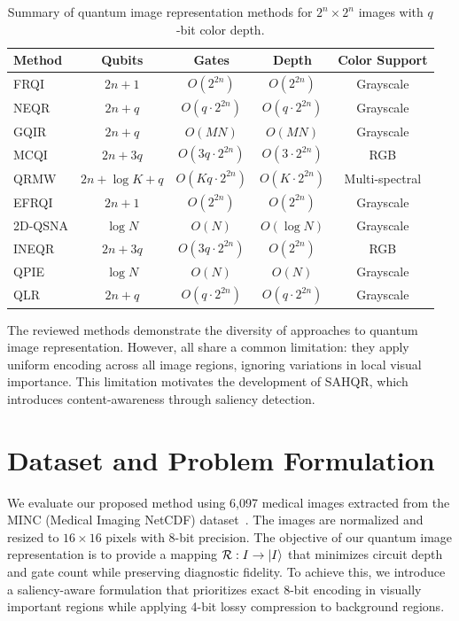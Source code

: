 \documentclass{ipol}
\begin{document}
\begin{table}[!htbp]
\caption{Summary of quantum image representation methods for $2^n \times 2^n$ images with $q$-bit color depth.}
\label{tab:related_summary}
\centering
\begin{tabular}{@{}lcccc@{}}
\toprule
Method & Qubits & Gates & Depth & Color Support \\
\midrule
FRQI & $2n+1$ & $O(2^{2n})$ & $O(2^{2n})$ & Grayscale \\
NEQR & $2n+q$ & $O(q \cdot 2^{2n})$ & $O(q \cdot 2^{2n})$ & Grayscale \\
GQIR & $2n+q$ & $O(MN)$ & $O(MN)$ & Grayscale \\
MCQI & $2n+3q$ & $O(3q \cdot 2^{2n})$ & $O(3 \cdot 2^{2n})$ & RGB \\
QRMW & $2n+\log K+q$ & $O(Kq \cdot 2^{2n})$ & $O(K \cdot 2^{2n})$ & Multi-spectral \\
EFRQI & $2n+1$ & $O(2^{2n})$ & $O(2^{2n})$ & Grayscale \\
2D-QSNA & $\log N$ & $O(N)$ & $O(\log N)$ & Grayscale \\
INEQR & $2n+3q$ & $O(3q \cdot 2^{2n})$ & $O(2^{2n})$ & RGB \\
QPIE & $\log N$ & $O(N)$ & $O(N)$ & Grayscale \\
QLR & $2n+q$ & $O(q \cdot 2^{2n})$ & $O(q \cdot 2^{2n})$ & Grayscale \\
\bottomrule
\end{tabular}
\end{table}

The reviewed methods demonstrate the diversity of approaches to quantum image representation. However, all share a common limitation: they apply uniform encoding across all image regions, ignoring variations in local visual importance. This limitation motivates the development of SAHQR, which introduces content-awareness through saliency detection.

\section{Dataset and Problem Formulation}\label{sec:dataset_problem}

We evaluate our proposed method using 6,097 medical images extracted from the MINC (Medical Imaging NetCDF) dataset~\cite{bib64}. The images are normalized and resized to $16 \times 16$ pixels with 8-bit precision. 
The objective of our quantum image representation is to provide a mapping $\mathcal{R}: I \rightarrow \ket{I}$ that minimizes circuit depth and gate count while preserving diagnostic fidelity. To achieve this, we introduce a saliency-aware formulation that prioritizes exact 8-bit encoding in visually important regions while applying 4-bit lossy compression to background regions.
\end{document}
